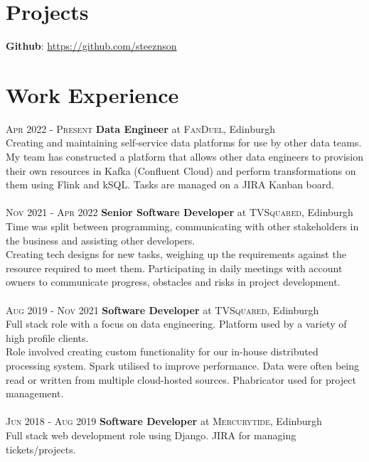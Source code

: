 \documentclass[14pt, a4paper]{extarticle}
\begin{document}
\begin{multicols}{2}
\section{Projects}
\noindent\textbf{Github}: \url{https://github.com/steeznson}

\columnbreak
\section{Work Experience}
\noindent\textsc{Apr 2022 - Present} \textbf{Data Engineer}
at \textsc{FanDuel}, Edinburgh\\
Creating and maintaining self-service data platforms for use by other data teams. My team has constructed a platform that allows other data engineers to provision their own resources in Kafka (Confluent Cloud) and perform transformations on them using Flink and kSQL. Tasks are managed on a JIRA Kanban board.\\
\\
\noindent\textsc{Nov 2021 - Apr 2022} \textbf{Senior Software Developer}
at \textsc{TVSquared}, Edinburgh\\
Time was split between programming, communicating with other stakeholders in the business and assisting other developers.\\
Creating tech designs for new tasks, weighing up the requirements against the resource required to meet them. Participating in daily meetings with account owners to communicate progress, obstacles and risks in project development.\\
\\
\noindent\textsc{Aug 2019 - Nov 2021} \textbf{Software Developer}
at \textsc{TVSquared}, Edinburgh\\
Full stack role with a focus on data engineering. Platform used by a variety of high profile clients.\\
Role involved creating custom functionality for our in-house distributed processing system. Spark utilised to improve performance. Data were often being read or written from multiple cloud-hosted sources. Phabricator used for project management.\\
\\
\noindent\textsc{Jun 2018 - Aug 2019} \textbf{Software Developer}
at \textsc{Mercurytide}, Edinburgh\\
Full stack web development role using Django. JIRA for managing tickets/projects.\\
\end{multicols}
\end{document}
